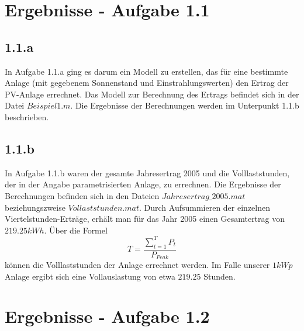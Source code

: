 \documentclass[a4paper,12pt]{article}
\begin{document}
	\section{Ergebnisse - Aufgabe 1.1}
	\subsection{1.1.a}
	In Aufgabe 1.1.a ging es darum ein Modell zu erstellen, das für eine bestimmte Anlage (mit gegebenem Sonnenstand und Einstrahlungswerten) den Ertrag der PV-Anlage errechnet.\newline
	Das Modell zur Berechnung des Ertrags befindet sich in der Datei $Beispiel1.m$. Die Ergebnisse der Berechnungen werden im Unterpunkt 1.1.b beschrieben.
	\subsection{1.1.b}
	In Aufgabe 1.1.b waren der gesamte Jahresertrag 2005 und die Volllaststunden, der in der Angabe parametrisierten Anlage, zu errechnen.\newline
	Die Ergebnisse der Berechnungen befinden sich in den Dateien $Jahresertrag\_2005.mat$ beziehungszweise $Vollaststunden.mat$.\newline
	Durch Aufsummieren der einzelnen Viertelstunden-Erträge, erhält man für das Jahr 2005 einen Gesamtertrag von $219.25kWh$.\newline
	Über die Formel
	\begin{equation}
	T=\frac{\sum \limits_{t=1}^T P_t}{P_{Peak}}
	\end{equation}
	können die Volllaststunden der Anlage errechnet werden. Im Falle unserer $1kWp$ Anlage ergibt sich eine Vollauslastung von etwa $219.25$ Stunden.
	\section{Ergebnisse - Aufgabe 1.2}
\end{document}
